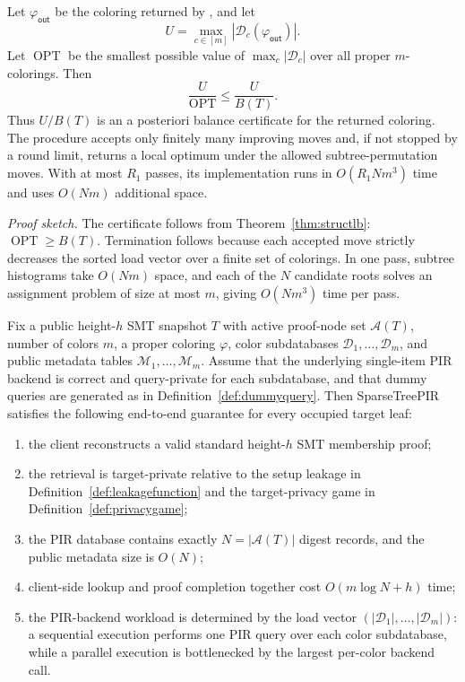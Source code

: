 \begin{proposition}
\label{prop:activebalancecert}
Let $\varphi_{\mathsf{out}}$ be the coloring returned by \ActiveBalance{}, and let
\[
U=\max_{c\in[m]}|\mathcal{D}_c(\varphi_{\mathsf{out}})|.
\]
Let $\operatorname{OPT}$ be the smallest possible value of $\max_c|\mathcal{D}_c|$ over all proper $m$-colorings. Then
\[
\frac{U}{\operatorname{OPT}}\le \frac{U}{B(T)}.
\]
Thus $U/B(T)$ is an a posteriori balance certificate for the returned coloring. The procedure accepts only finitely many improving moves and, if not stopped by a round limit, returns a local optimum under the allowed subtree-permutation moves. With at most $R_1$ passes, its implementation runs in $O(R_1Nm^3)$ time and uses $O(Nm)$ additional space.
\end{proposition}

\noindent\emph{Proof sketch.}
The certificate follows from Theorem~\ref{thm:structlb}: $\operatorname{OPT}\ge B(T)$. Termination follows because each accepted move strictly decreases the sorted load vector over a finite set of colorings. In one pass, subtree histograms take $O(Nm)$ space, and each of the $N$ candidate roots solves an assignment problem of size at most $m$, giving $O(Nm^3)$ time per pass.

\begin{theorem}
\label{thm:endtoend}
Fix a public height-$h$ SMT snapshot $T$ with active proof-node set $\mathcal{A}(T)$, number of colors $m$, a proper coloring $\varphi$, color subdatabases $\mathcal{D}_1,\ldots,\mathcal{D}_m$, and public metadata tables $\mathcal{M}_1,\ldots,\mathcal{M}_m$. Assume that the underlying single-item PIR backend is correct and query-private for each subdatabase, and that dummy queries are generated as in Definition~\ref{def:dummyquery}. Then SparseTreePIR satisfies the following end-to-end guarantee for every occupied target leaf:
\begin{enumerate}[leftmargin=2em]
  \item the client reconstructs a valid standard height-$h$ SMT membership proof;
  \item the retrieval is target-private relative to the setup leakage in Definition~\ref{def:leakagefunction} and the target-privacy game in Definition~\ref{def:privacygame};
  \item the PIR database contains exactly $N=|\mathcal{A}(T)|$ digest records, and the public metadata size is $O(N)$;
  \item client-side lookup and proof completion together cost $O(m\log N+h)$ time;
  \item the PIR-backend workload is determined by the load vector $(|\mathcal{D}_1|,\ldots,|\mathcal{D}_m|)$: a sequential execution performs one PIR query over each color subdatabase, while a parallel execution is bottlenecked by the largest per-color backend call.
\end{enumerate}
\end{theorem}

